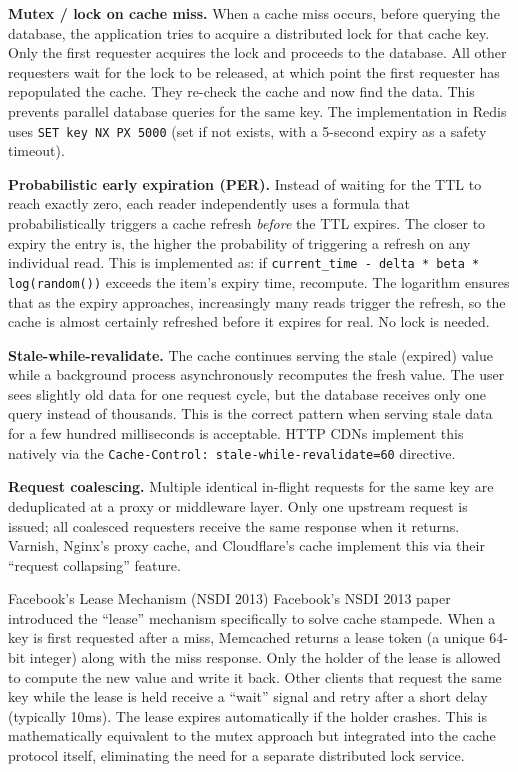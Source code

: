 \documentclass[11pt,a4paper]{article}
\begin{document}
\textbf{Mutex / lock on cache miss.} When a cache miss occurs, before querying the database, the application tries to acquire a distributed lock for that cache key. Only the first requester acquires the lock and proceeds to the database. All other requesters wait for the lock to be released, at which point the first requester has repopulated the cache. They re-check the cache and now find the data. This prevents parallel database queries for the same key. The implementation in Redis uses \texttt{SET key NX PX 5000} (set if not exists, with a 5-second expiry as a safety timeout).

\textbf{Probabilistic early expiration (PER).} Instead of waiting for the TTL to reach exactly zero, each reader independently uses a formula that probabilistically triggers a cache refresh \emph{before} the TTL expires. The closer to expiry the entry is, the higher the probability of triggering a refresh on any individual read. This is implemented as: if \texttt{current\_time - delta * beta * log(random())} exceeds the item's expiry time, recompute. The logarithm ensures that as the expiry approaches, increasingly many reads trigger the refresh, so the cache is almost certainly refreshed before it expires for real. No lock is needed.

\textbf{Stale-while-revalidate.} The cache continues serving the stale (expired) value while a background process asynchronously recomputes the fresh value. The user sees slightly old data for one request cycle, but the database receives only one query instead of thousands. This is the correct pattern when serving stale data for a few hundred milliseconds is acceptable. HTTP CDNs implement this natively via the \texttt{Cache-Control: stale-while-revalidate=60} directive.

\textbf{Request coalescing.} Multiple identical in-flight requests for the same key are deduplicated at a proxy or middleware layer. Only one upstream request is issued; all coalesced requesters receive the same response when it returns. Varnish, Nginx's proxy cache, and Cloudflare's cache implement this via their ``request collapsing'' feature.

\begin{industrybox}{Facebook's Lease Mechanism (NSDI 2013)}
Facebook's NSDI 2013 paper introduced the ``lease'' mechanism specifically to solve cache stampede. When a key is first requested after a miss, Memcached returns a lease token (a unique 64-bit integer) along with the miss response. Only the holder of the lease is allowed to compute the new value and write it back. Other clients that request the same key while the lease is held receive a ``wait'' signal and retry after a short delay (typically 10ms). The lease expires automatically if the holder crashes. This is mathematically equivalent to the mutex approach but integrated into the cache protocol itself, eliminating the need for a separate distributed lock service.
\end{industrybox}
\end{document}
